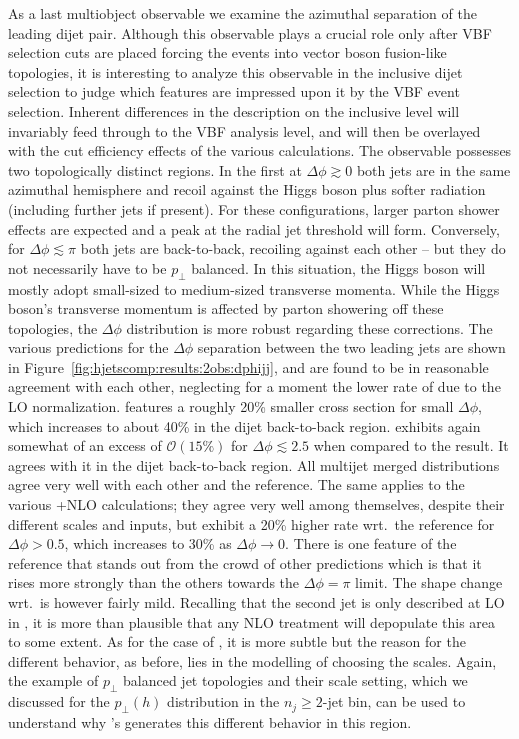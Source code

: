As a last multiobject observable we examine the azimuthal separation of 
the leading dijet pair. Although this observable plays a crucial role 
only after VBF selection cuts are placed forcing the events into
vector boson fusion-like topologies, it is interesting to analyze this
observable in the inclusive dijet selection to judge which features
are impressed upon it by the VBF event selection.
Inherent differences in the description on the inclusive level will
invariably feed through to the VBF analysis level, and will then be
overlayed with the cut efficiency effects of the various calculations.
The observable possesses two topologically distinct regions. In the
first at $\Delta\phi\gtrsim0$ both jets are in the same azimuthal
hemisphere and recoil against the Higgs boson plus softer radiation
(including further jets if present). For these configurations, larger
parton shower effects are expected and a peak at the radial jet
threshold will form.
Conversely, for $\Delta\phi\lesssim\pi$ both jets are back-to-back,
recoiling against each other -- but they do not necessarily have to be
$p_\perp$ balanced. In this situation, the Higgs boson will
mostly adopt small-sized to medium-sized transverse momenta.
While the Higgs boson's transverse momentum is affected by parton
showering off these topologies, the $\Delta\phi$ distribution is more
robust regarding these corrections.
The various predictions for the $\Delta\phi$ separation between the
two leading jets are shown in Figure~\ref{fig:hjetscomp:results:2obs:dphijj},
and are found to be in reasonable agreement with each other,
neglecting for a moment the lower rate of \Hej due to the LO
normalization. \Hej
features a roughly 20\% smaller cross section for small $\Delta\phi$,
which increases to about 40\% in the dijet back-to-back region.
\Sherpa \NNLOPS exhibits again somewhat of an excess of
$\mathcal{O}(15\%)$ for $\Delta\phi\lesssim2.5$ when compared to the
\Powheg \NNLOPS result. It agrees with it in the dijet back-to-back
region. All multijet merged distributions agree very well with each
other and the reference. The same applies to the various
\GoSam{}+\Sherpa NLO calculations; they agree very well among
themselves, despite their different scales and inputs, but exhibit a
20\% higher rate wrt.~the reference for $\Delta\phi>0.5$, which
increases to 30\% as $\Delta\phi\to0$. 
There is one feature of the \Powheg reference that stands out from the
crowd of other predictions which is that it rises more strongly
than the others towards the $\Delta\phi=\pi$ limit. The shape change
wrt.~\Hej is however fairly mild. Recalling that the second jet is
only described at LO in \Powheg, it is more than plausible that any
NLO treatment will depopulate this area to some extent. As for the
case of \Sherpa \NNLOPS, it is more subtle but the reason for the
different behavior, as before, lies in the modelling of choosing the
scales. Again, the example of $p_\perp$ balanced jet topologies and
their scale setting, which we discussed for the $p_\perp(h)$
distribution in the $n_j\ge2$-jet bin, can be used to understand why
\Sherpa's \NNLOPS generates this different behavior in this region.



